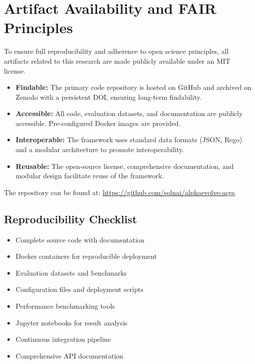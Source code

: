 \section{Artifact Availability and FAIR Principles}\label{sec:appendix_artifacts}
To ensure full reproducibility and adherence to open science principles, all artifacts related to this research are made publicly available under an MIT license.

\begin{itemize}[leftmargin=*,topsep=0pt,itemsep=2pt,parsep=0pt]
    \item \textbf{Findable:} The primary code repository is hosted on GitHub and archived on Zenodo with a persistent DOI, ensuring long-term findability.
    \item \textbf{Accessible:} All code, evaluation datasets, and documentation are publicly accessible. Pre-configured Docker images are provided.
    \item \textbf{Interoperable:} The framework uses standard data formats (JSON, Rego) and a modular architecture to promote interoperability.
    \item \textbf{Reusable:} The open-source license, comprehensive documentation, and modular design facilitate reuse of the framework.
\end{itemize}

The repository can be found at: \url{https://github.com/solnai/alphaevolve-acgs}.

\subsection{Reproducibility Checklist}
\begin{itemize}[leftmargin=*,topsep=0pt,itemsep=2pt,parsep=0pt]
    \item[\checkmarkcustom{}] Complete source code with documentation
    \item[\checkmarkcustom{}] Docker containers for reproducible deployment
    \item[\checkmarkcustom{}] Evaluation datasets and benchmarks
    \item[\checkmarkcustom{}] Configuration files and deployment scripts
    \item[\checkmarkcustom{}] Performance benchmarking tools
    \item[\checkmarkcustom{}] Jupyter notebooks for result analysis
    \item[\checkmarkcustom{}] Continuous integration pipeline
    \item[\checkmarkcustom{}] Comprehensive API documentation
\end{itemize}
